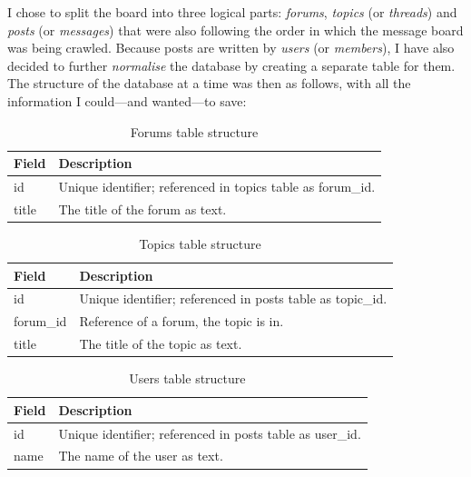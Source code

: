     I chose to split the board into three logical parts: \emph{forums}, \emph{topics} (or \emph{threads}) and \emph{posts} (or \emph{messages}) that were also following the order in which the message board was being crawled. Because posts are written by \emph{users} (or \emph{members}), I have also decided to further \emph{normalise} the database by creating a separate table for them. The structure of the database at a time was then as follows, with all the information I could---and wanted---to save:
    \begin{table}[H]
      \begin{tabularx}{\textwidth}{|L{0.3}|L{1.7}|} \hline
         \textbf{Field} & \textbf{Description} \\\hline
        id & Unique identifier; referenced in topics table as forum\_id. \\
        title & The title of the forum as text. \\\hline
      \end{tabularx}
      \caption{Forums table structure}
    \end{table}
    \begin{table}[H]
      \begin{tabularx}{\textwidth}{|L{0.3}|L{1.7}|} \hline
         \textbf{Field} & \textbf{Description} \\\hline
        id & Unique identifier; referenced in posts table as topic\_id. \\
        forum\_id & Reference of a forum, the topic is in. \\
        title & The title of the topic as text. \\\hline
      \end{tabularx}
      \caption{Topics table structure}
    \end{table}
    \begin{table}[H]
      \begin{tabularx}{\textwidth}{|L{0.3}|L{1.7}|} \hline
         \textbf{Field} & \textbf{Description} \\\hline
        id & Unique identifier; referenced in posts table as user\_id. \\
        name & The name of the user as text. \\\hline
      \end{tabularx}
      \caption{Users table structure}
    \end{table}
